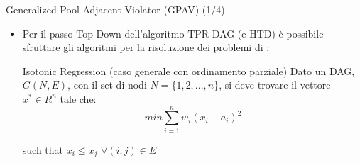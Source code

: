 \documentclass[9pt]{beamer}
\begin{document}
\begin{tframe}{Generalized Pool Adjacent Violator (GPAV) (1/4)}
\begin{itemize}
\item Per il passo Top-Down dell’algoritmo TPR-DAG (e HTD) è possibile sfruttare gli algoritmi per la risoluzione dei problemi di :
\begin{block}{Isotonic Regression (caso generale con ordinamento parziale)}
Dato un DAG, $G(N, E)$, con il set di nodi $N = \{1, 2, ..., n\}$, si deve trovare il vettore $x^{*}\in R^{n}$ tale che:
\[
min \sum_{i=1}^{n} w_i (x_i - a_i)^2
\]
\begin{center}
such that $x_i \le x_j$ $\forall (i,j) \in E $ 
\end{center}
\end{block} 

\end{itemize}
\end{tframe}
\end{document}
